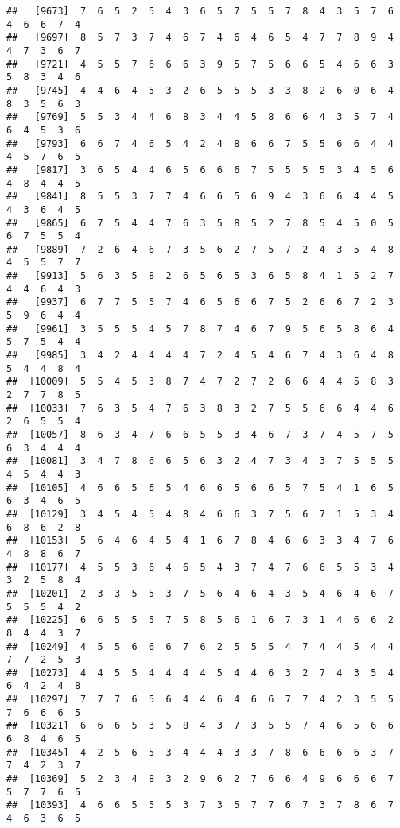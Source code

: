 \documentclass[
]{book}
\begin{document}
\begin{verbatim}
##   [9673]  7  6  5  2  5  4  3  6  5  7  5  5  7  8  4  3  5  7  6  4  6  6  7  4
##   [9697]  8  5  7  3  7  4  6  7  4  6  4  6  5  4  7  7  8  9  4  4  7  3  6  7
##   [9721]  4  5  5  7  6  6  6  3  9  5  7  5  6  6  5  4  6  6  3  5  8  3  4  6
##   [9745]  4  4  6  4  5  3  2  6  5  5  5  3  3  8  2  6  0  6  4  8  3  5  6  3
##   [9769]  5  5  3  4  4  6  8  3  4  4  5  8  6  6  4  3  5  7  4  6  4  5  3  6
##   [9793]  6  6  7  4  6  5  4  2  4  8  6  6  7  5  5  6  6  4  4  4  5  7  6  5
##   [9817]  3  6  5  4  4  6  5  6  6  6  7  5  5  5  5  3  4  5  6  4  8  4  4  5
##   [9841]  8  5  5  3  7  7  4  6  6  5  6  9  4  3  6  6  4  4  5  4  3  6  4  5
##   [9865]  6  7  5  4  4  7  6  3  5  8  5  2  7  8  5  4  5  0  5  6  7  5  5  4
##   [9889]  7  2  6  4  6  7  3  5  6  2  7  5  7  2  4  3  5  4  8  4  5  5  7  7
##   [9913]  5  6  3  5  8  2  6  5  6  5  3  6  5  8  4  1  5  2  7  4  4  6  4  3
##   [9937]  6  7  7  5  5  7  4  6  5  6  6  7  5  2  6  6  7  2  3  5  9  6  4  4
##   [9961]  3  5  5  5  4  5  7  8  7  4  6  7  9  5  6  5  8  6  4  5  7  5  4  4
##   [9985]  3  4  2  4  4  4  4  7  2  4  5  4  6  7  4  3  6  4  8  5  4  4  8  4
##  [10009]  5  5  4  5  3  8  7  4  7  2  7  2  6  6  4  4  5  8  3  2  7  7  8  5
##  [10033]  7  6  3  5  4  7  6  3  8  3  2  7  5  5  6  6  4  4  6  2  6  5  5  4
##  [10057]  8  6  3  4  7  6  6  5  5  3  4  6  7  3  7  4  5  7  5  6  3  4  4  4
##  [10081]  3  4  7  8  6  6  5  6  3  2  4  7  3  4  3  7  5  5  5  4  5  4  4  3
##  [10105]  4  6  6  5  6  5  4  6  6  5  6  6  5  7  5  4  1  6  5  6  3  4  6  5
##  [10129]  3  4  5  4  5  4  8  4  6  6  3  7  5  6  7  1  5  3  4  6  8  6  2  8
##  [10153]  5  6  4  6  4  5  4  1  6  7  8  4  6  6  3  3  4  7  6  4  8  8  6  7
##  [10177]  4  5  5  3  6  4  6  5  4  3  7  4  7  6  6  5  5  3  4  3  2  5  8  4
##  [10201]  2  3  3  5  5  3  7  5  6  4  6  4  3  5  4  6  4  6  7  5  5  5  4  2
##  [10225]  6  6  5  5  5  7  5  8  5  6  1  6  7  3  1  4  6  6  2  8  4  4  3  7
##  [10249]  4  5  5  6  6  6  7  6  2  5  5  5  4  7  4  4  5  4  4  7  7  2  5  3
##  [10273]  4  4  5  5  4  4  4  4  5  4  4  6  3  2  7  4  3  5  4  6  4  2  4  8
##  [10297]  7  7  7  6  5  6  4  4  6  4  6  6  7  7  4  2  3  5  5  7  6  6  6  5
##  [10321]  6  6  6  5  3  5  8  4  3  7  3  5  5  7  4  6  5  6  6  6  8  4  6  5
##  [10345]  4  2  5  6  5  3  4  4  4  3  3  7  8  6  6  6  6  3  7  7  4  2  3  7
##  [10369]  5  2  3  4  8  3  2  9  6  2  7  6  6  4  9  6  6  6  7  5  7  7  6  5
##  [10393]  4  6  6  5  5  5  3  7  3  5  7  7  6  7  3  7  8  6  7  4  6  3  6  5

\end{verbatim}
\end{document}
